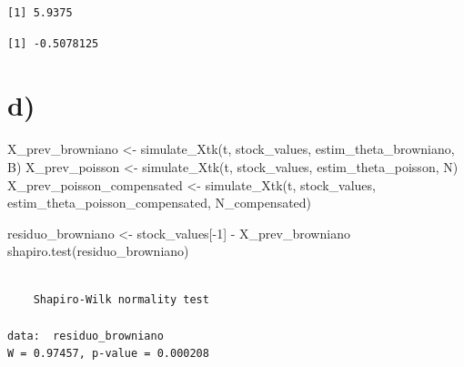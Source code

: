 \documentclass[
  letterpaper,
  DIV=11,
  numbers=noendperiod]{scrreprt}
\newenvironment{Shaded}{\begin{snugshade}}{\end{snugshade}}
\newcommand{\AttributeTok}[1]{\textcolor[rgb]{0.40,0.45,0.13}{#1}}
\newcommand{\DecValTok}[1]{\textcolor[rgb]{0.68,0.00,0.00}{#1}}
\newcommand{\DocumentationTok}[1]{\textcolor[rgb]{0.37,0.37,0.37}{\textit{#1}}}
\newcommand{\FunctionTok}[1]{\textcolor[rgb]{0.28,0.35,0.67}{#1}}
\newcommand{\NormalTok}[1]{\textcolor[rgb]{0.00,0.23,0.31}{#1}}
\newcommand{\OtherTok}[1]{\textcolor[rgb]{0.00,0.23,0.31}{#1}}
\newcommand{\SpecialCharTok}[1]{\textcolor[rgb]{0.37,0.37,0.37}{#1}}
\begin{document}
\begin{verbatim}
[1] 5.9375
\end{verbatim}

\begin{Shaded}
\end{Shaded}

\begin{verbatim}
[1] -0.5078125
\end{verbatim}

\hypertarget{d}{%
\section*{d)}\label{d}}


\begin{Shaded}
\begin{Highlighting}[]
\NormalTok{X\_prev\_browniano }\OtherTok{\textless{}{-}}
    \FunctionTok{simulate\_Xtk}\NormalTok{(t, stock\_values, estim\_theta\_browniano, B)}
\NormalTok{X\_prev\_poisson }\OtherTok{\textless{}{-}}
    \FunctionTok{simulate\_Xtk}\NormalTok{(t, stock\_values, estim\_theta\_poisson, N)}
\NormalTok{X\_prev\_poisson\_compensated }\OtherTok{\textless{}{-}}
    \FunctionTok{simulate\_Xtk}\NormalTok{(t, stock\_values, estim\_theta\_poisson\_compensated, N\_compensated)}

\NormalTok{residuo\_browniano }\OtherTok{\textless{}{-}}\NormalTok{ stock\_values[}\SpecialCharTok{{-}}\DecValTok{1}\NormalTok{] }\SpecialCharTok{{-}}\NormalTok{ X\_prev\_browniano}
\FunctionTok{shapiro.test}\NormalTok{(residuo\_browniano)}
\end{Highlighting}
\end{Shaded}

\begin{verbatim}

    Shapiro-Wilk normality test

data:  residuo_browniano
W = 0.97457, p-value = 0.000208
\end{verbatim}
\end{document}
